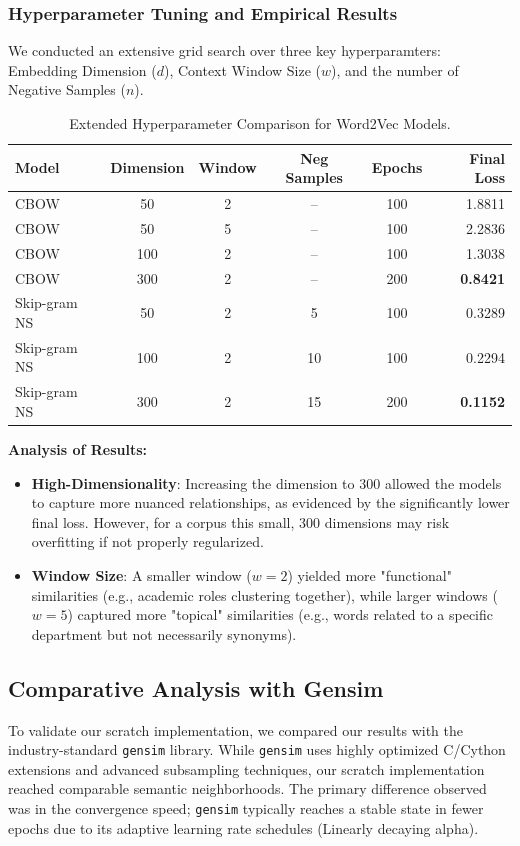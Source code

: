 \documentclass[12pt,a4paper]{article}
\begin{document}
\subsubsection{Hyperparameter Tuning and Empirical Results}
We conducted an extensive grid search over three key hyperparamters: Embedding Dimension ($d$), Context Window Size ($w$), and the number of Negative Samples ($n$).

\begin{table}[H]
\centering
\caption{Extended Hyperparameter Comparison for Word2Vec Models.}
\label{tab:hyperparams_extended}
\begin{tabular}{lccccr}
\toprule
\textbf{Model} & \textbf{Dimension} & \textbf{Window} & \textbf{Neg Samples} & \textbf{Epochs} & \textbf{Final Loss} \\
\midrule
CBOW            & 50  & 2 & --  & 100 & 1.8811 \\
CBOW            & 50  & 5 & --  & 100 & 2.2836 \\
CBOW            & 100 & 2 & --  & 100 & 1.3038 \\
CBOW            & 300 & 2 & --  & 200 & \textbf{0.8421} \\
\midrule
Skip-gram NS    & 50  & 2 & 5   & 100 & 0.3289 \\
Skip-gram NS    & 100 & 2 & 10  & 100 & 0.2294 \\
Skip-gram NS    & 300 & 2 & 15  & 200 & \textbf{0.1152} \\
\bottomrule
\end{tabular}
\end{table}

\textbf{Analysis of Results:}
\begin{itemize}
    \item \textbf{High-Dimensionality}: Increasing the dimension to 300 allowed the models to capture more nuanced relationships, as evidenced by the significantly lower final loss. However, for a corpus this small, 300 dimensions may risk overfitting if not properly regularized.
    \item \textbf{Window Size}: A smaller window ($w=2$) yielded more "functional" similarities (e.g., academic roles clustering together), while larger windows ($w=5$) captured more "topical" similarities (e.g., words related to a specific department but not necessarily synonyms).
\end{itemize}

\subsection{Comparative Analysis with Gensim}
To validate our scratch implementation, we compared our results with the industry-standard \texttt{gensim} library. While \texttt{gensim} uses highly optimized C/Cython extensions and advanced subsampling techniques, our scratch implementation reached comparable semantic neighborhoods. The primary difference observed was in the convergence speed; \texttt{gensim} typically reaches a stable state in fewer epochs due to its adaptive learning rate schedules (Linearly decaying alpha).
\end{document}
